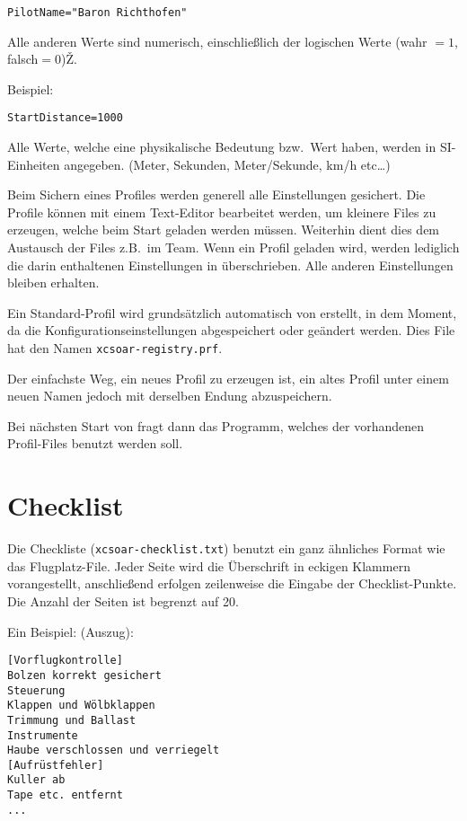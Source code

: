 \begin{verbatim}
PilotName="Baron Richthofen"
\end{verbatim}

Alle anderen Werte sind numerisch, einschließlich der logischen Werte (wahr $=1$, falsch$=0$)Ž.

Beispiel:


\begin{verbatim}
StartDistance=1000
\end{verbatim}

Alle Werte, welche eine physikalische Bedeutung bzw.\ Wert haben, werden in \textsf{SI}-Einheiten angegeben.
(Meter, Sekunden, Meter/Sekunde, km/h etc\dots)

Beim Sichern eines Profiles werden generell alle Einstellungen gesichert.
Die Profile können mit einem Text-Editor bearbeitet werden, um kleinere Files zu erzeugen,
welche beim Start geladen werden müssen. Weiterhin dient dies dem Austausch der Files
z.B.\ im Team. Wenn ein Profil geladen wird, werden lediglich die darin enthaltenen
Einstellungen in \xc überschrieben. Alle anderen Einstellungen bleiben erhalten.

Ein Standard-Profil wird grundsätzlich automatisch von  \xc erstellt, in dem Moment, da
die Konfigurationseinstellungen abgespeichert oder geändert werden.
Dies File hat den Namen  \verb|xcsoar-registry.prf|.

Der einfachste Weg, ein neues Profil zu erzeugen ist, ein altes Profil unter einem neuen
Namen jedoch mit derselben Endung abzuspeichern.

Bei nächsten Start von \xc  fragt dann das Programm, welches der vorhandenen Profil-Files benutzt werden soll.

\section{Checklist}

Die Checkliste  (\verb|xcsoar-checklist.txt|) benutzt ein ganz ähnliches Format
wie das Flugplatz-File. 
Jeder Seite wird die Überschrift in eckigen Klammern vorangestellt, anschließend erfolgen
zeilenweise die Eingabe der Checklist-Punkte. Die Anzahl der Seiten ist begrenzt auf 20.

Ein Beispiel: (Auszug):
\begin{verbatim}
[Vorflugkontrolle]
Bolzen korrekt gesichert
Steuerung
Klappen und Wölbklappen
Trimmung und Ballast
Instrumente
Haube verschlossen und verriegelt
[Aufrüstfehler]
Kuller ab
Tape etc. entfernt
...
\end{verbatim}


